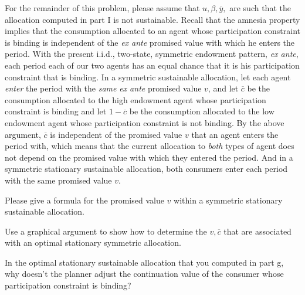  \medskip
{} For the remainder of this
problem, please assume that $u,\beta, \overline y, $ are such that
the allocation
 computed in part I is not sustainable.     Recall that
the amnesia property  implies that the
 consumption allocated to an agent whose participation constraint
 is binding is independent of the  {\it ex ante\/} promised value with which he enters the
 period.  With the
 present i.i.d., two-state, symmetric endowment pattern, {\it ex ante\/},
 each period each of
 our two agents has an equal chance that it is his participation constraint
 that is binding.  In a symmetric sustainable allocation, let
each agent {\it enter\/} the period with the {\it same\/} {\it ex
ante\/} promised value $v$, and
   let $\overline c$ be the consumption allocated to
 the high endowment agent whose participation constraint is binding and let
 $1-\overline c$ be the consumption allocated to the low endowment agent whose
 participation constraint is not binding. By the above argument,
  $\overline c$ is independent of the promised value
 $v$ that an agent enters the period with, which means that the current allocation
 to {\it both\/} types of agent does not depend on the promised value with which they entered the period.
   And in a symmetric stationary sustainable allocation,
 both consumers enter each period with the same promised value $v$.

 \medskip
 Please give a formula for the promised value $v$ within
 a symmetric stationary sustainable allocation.


\medskip
{} Use a graphical argument to show how to
determine the $v, \overline c$ that are associated with an optimal
stationary symmetric allocation.

\medskip
{}  In the optimal stationary sustainable
allocation that you computed in part g, why doesn't the planner
adjust the continuation value of the consumer whose participation
constraint is binding?

